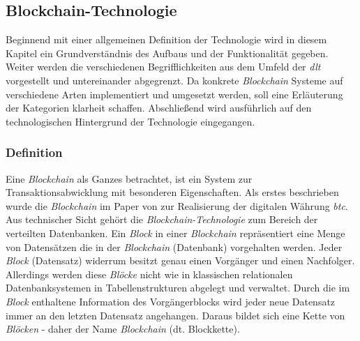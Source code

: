 \subsection{Blockchain-Technologie} \label{sec:blockchain-technology}

Beginnend mit einer allgemeinen Definition der Technologie wird in diesem Kapitel ein Grundverständnis des Aufbaus und der Funktionalität gegeben. Weiter werden die verschiedenen Begrifflichkeiten aus dem Umfeld der \textit{\acf{dlt}} vorgestellt und untereinander abgegrenzt. Da konkrete \textit{Blockchain} Systeme auf verschiedene Arten implementiert und umgesetzt werden, soll eine Erläuterung der Kategorien klarheit schaffen. Abschließend wird ausführlich auf den technologischen Hintergrund der Technologie eingegangen.

\subsubsection{Definition} \label{blockchain-definition}
Eine \textit{Blockchain} als Ganzes betrachtet, ist ein System zur Transaktionsabwicklung mit besonderen Eigenschaften. Als erstes beschrieben wurde die \textit{Blockchain} im Paper von \cite{Nakamoto2009} zur Realisierung der digitalen Währung \textit{\ac{btc}}. Aus technischer Sicht gehört die \textit{Blockchain-Technologie} zum Bereich der verteilten Datenbanken. Ein \textit{Block} in einer \textit{Blockchain} repräsentiert eine Menge von Datensätzen die in der \textit{Blockchain} (Datenbank) vorgehalten werden. Jeder \textit{Block} (Datensatz) widerrum besitzt genau einen Vorgänger und einen Nachfolger. Allerdings werden diese \textit{Blöcke} nicht wie in klassischen relationalen Datenbanksystemen in Tabellenstrukturen abgelegt und verwaltet. Durch die im \textit{Block} enthaltene Information des Vorgängerblocks wird jeder neue Datensatz immer an den letzten Datensatz angehangen. Daraus bildet sich eine Kette von \textit{Blöcken} - daher der Name \textit{Blockchain} (dt. Blockkette).

